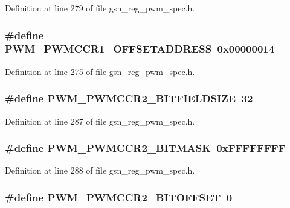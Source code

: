 Definition at line 279 of file gsn\_\-reg\_\-pwm\_\-spec.h.

\hypertarget{a00565_a86f5110d45040c237a33483a0362c951}{
\subsubsection[{PWM\_\-PWMCCR1\_\-OFFSETADDRESS}]{\setlength{\rightskip}{0pt plus 5cm}\#define PWM\_\-PWMCCR1\_\-OFFSETADDRESS~0x00000014}}
\label{a00565_a86f5110d45040c237a33483a0362c951}


Definition at line 275 of file gsn\_\-reg\_\-pwm\_\-spec.h.

\hypertarget{a00565_a9452ecb41ecd79d01af0caffd9119bca}{
\subsubsection[{PWM\_\-PWMCCR2\_\-BITFIELDSIZE}]{\setlength{\rightskip}{0pt plus 5cm}\#define PWM\_\-PWMCCR2\_\-BITFIELDSIZE~32}}
\label{a00565_a9452ecb41ecd79d01af0caffd9119bca}


Definition at line 287 of file gsn\_\-reg\_\-pwm\_\-spec.h.

\hypertarget{a00565_a9c092dac6dff536fa655daa89f6a1143}{
\subsubsection[{PWM\_\-PWMCCR2\_\-BITMASK}]{\setlength{\rightskip}{0pt plus 5cm}\#define PWM\_\-PWMCCR2\_\-BITMASK~0xFFFFFFFF}}
\label{a00565_a9c092dac6dff536fa655daa89f6a1143}


Definition at line 288 of file gsn\_\-reg\_\-pwm\_\-spec.h.

\hypertarget{a00565_a04dc50da34fd6cd18f8e4f5ad9be1eaf}{
\subsubsection[{PWM\_\-PWMCCR2\_\-BITOFFSET}]{\setlength{\rightskip}{0pt plus 5cm}\#define PWM\_\-PWMCCR2\_\-BITOFFSET~0}}
\label{a00565_a04dc50da34fd6cd18f8e4f5ad9be1eaf}


